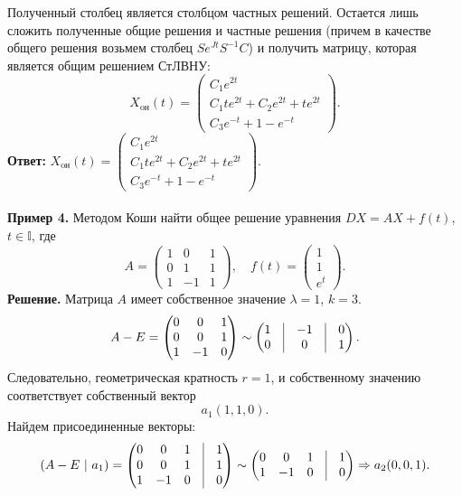 \documentclass[a4paper, 12pt]{article}
\newcommand{\I}{\mathbb{I}}
\begin{document}
Полученный столбец является столбцом частных решений. Остается лишь сложить полученные общие решения и частные решения (причем в качестве общего решения возьмем столбец $Se^{Jt}S^{-1}C$) и получить матрицу, которая является общим решением СтЛВНУ:
$$X_{\text{oн}}(t) = \begin{pmatrix}
	C_1e^{2t}\\
	C_1te^{2t} + C_2e^{2t} + te^{2t}\\
	C_3e^{-t} + 1 - e^{-t}
\end{pmatrix}.$$
\textbf{Ответ:} $X_{\text{oн}}(t) = \begin{pmatrix}
	C_1e^{2t}\\
	C_1te^{2t} + C_2e^{2t} + te^{2t}\\
	C_3e^{-t} + 1 - e^{-t}
\end{pmatrix}.$\\\\
\textbf{Пример 4.} Методом Коши найти общее решение уравнения $DX = AX + f(t)$, $t \in \I$, где
$$A = \begin{pmatrix}
	1 & 0 & 1\\
	0 & 1 & 1\\
	1 & -1 & 1
\end{pmatrix},\quad f(t)=\begin{pmatrix}
	1\\ 1\\ e^{t}
\end{pmatrix}.$$
\textbf{Решение.} Матрица $A$ имеет собственное значение $\lambda = 1$, $k = 3$. 
$$A - E = \begin{pmatrix}
	0 & 0 & 1\\
	0 & 0 & 1\\
	1 & -1 & 0
\end{pmatrix}\sim \begin{pmatrix}
1 & \vline & -1 & \vline& 0\\
0 & \vline & 0 & \vline& 1
\end{pmatrix}.$$
Следовательно, геометрическая кратность $r = 1$, и собственному значению соответствует собственный вектор $$a_1(1,1,0).$$
Найдем присоединенные векторы:
$$(A-E\ |\ a_1) = \begin{pmatrix}
		0 & 0 & 1 & \vline & 1\\
	0 & 0 & 1 & \vline & 1\\
	1 & -1 & 0 & \vline & 0
\end{pmatrix}\sim \begin{pmatrix}
0 & 0 & 1  & \vline & 1\\
1 & -1 & 0  & \vline & 0
\end{pmatrix}\Rightarrow a_2(0,0,1).$$
\end{document}
